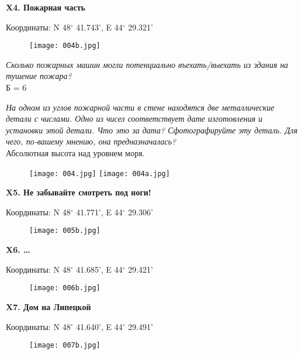 \documentclass[pscyr]{hedwork}
\begin{document}
  \newpage

  \textbf{X4. Пожарная часть}

  Координаты: N 48\( ^\circ \) 41.743', E 44\( ^\circ \) 29.321'

  \begin{figure}[h!]
    \center
    \texttt{[image: 004b.jpg]}
  \end{figure}

  \emph{Сколько пожарных машин могли потенциально въехать/выехать из здания на
  тушение пожара?} \\
  Б = 6

  \emph{На одном из углов пожарной части в стене находятся две металлические
  детали с числами. Одно из чисел соответствует дате изготовления и установки
  этой детали. Что это за дата? Сфотографируйте эту деталь. Для чего, по-вашему
  мнению, она предназначалась?} \\  
  Абсолютная высота над уровнем моря.

  \begin{figure}[h!]
    \center
    \texttt{[image: 004.jpg]} \hfill
    \texttt{[image: 004a.jpg]}
  \end{figure}

  \newpage

  \textbf{X5. Не забывайте смотреть под ноги!}

  Координаты: N 48\( ^\circ \) 41.771', E 44\( ^\circ \) 29.306'

  \begin{figure}[h!]
    \center
    \texttt{[image: 005b.jpg]}
  \end{figure}

  \newpage

  \textbf{X6. \ldots}

  Координаты: N 48\( ^\circ \) 41.685', E 44\( ^\circ \) 29.421'

  \begin{figure}[h!]
    \center
    \texttt{[image: 006b.jpg]}
  \end{figure}

  \newpage

  \textbf{X7. Дом на Липецкой}

  Координаты: N 48\( ^\circ \) 41.640', E 44\( ^\circ \) 29.491'

  \begin{figure}[h!]
    \center
    \texttt{[image: 007b.jpg]}
  \end{figure}
\end{document}
